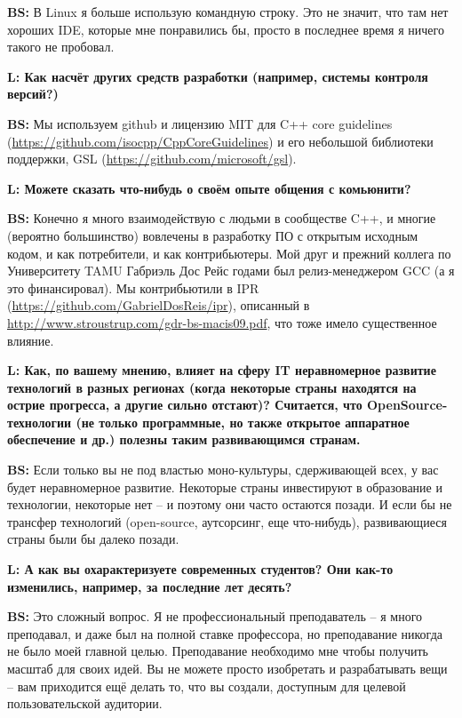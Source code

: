 \documentclass[10pt, a5paper]{article}
\begin{document}
\begin{Parallel}[p]{}{}
{{\noindent \bf BS:} В Linux я больше использую командную строку. Это не значит, что там нет хороших IDE, которые мне понравились бы, просто в последнее время я ничего такого не пробовал.

{\noindent \bf L: Как насчёт других средств разработки (например, системы контроля версий?)}

{\noindent \bf BS:} Мы используем github и лицензию MIT для C++ core guidelines (\href{https://github.com/isocpp/CppCoreGuidelines}{https://github.com/isocpp/CppCoreGuidelines}) и его небольшой библиотеки поддержки, GSL (\url{https://github.com/microsoft/gsl}).

{\noindent \bf L: Можете сказать что-нибудь о своём опыте общения с комьюнити?}

{\noindent \bf BS:} Конечно я много взаимодействую с людьми в сообществе C++, и многие (вероятно большинство) вовлечены в разработку ПО с открытым исходным кодом, и как потребители, и как контрибьютеры. Мой друг и прежний коллега по Университету TAMU Габриэль Дос Рейс годами был релиз-менеджером GCC (а я это финансировал). Мы контрибьютили в IPR (\url{https://github.com/GabrielDosReis/ipr}), описанный в \url{http://www.stroustrup.com/gdr-bs-macis09.pdf}, что тоже имело существенное влияние.

{\noindent \bf L:  Как, по вашему мнению, влияет на сферу IT неравномерное развитие технологий в разных регионах (когда некоторые страны находятся на острие прогресса, а другие сильно отстают)? Считается, что OpenSource-технологии (не только программные, но также открытое аппаратное обеспечение и др.) полезны таким развивающимся странам.}

{\noindent \bf BS:} Если только вы не под властью моно-культуры, сдерживающей всех, у вас будет неравномерное развитие. Некоторые страны инвестируют в образование и технологии, некоторые нет -- и поэтому они часто остаются позади. И если бы не трансфер технологий (open-source, аутсорсинг, еще что-нибудь), развивающиеся страны были бы далеко позади.

{\noindent \bf L: А как вы охарактеризуете современных студентов? Они как-то изменились, например, за последние лет десять?}

{\noindent \bf BS:} Это сложный вопрос. Я не профессиональный преподаватель – я много преподавал, и даже был на полной ставке профессора, но преподавание никогда не было моей главной целью. Преподавание необходимо мне чтобы получить масштаб для своих идей. Вы не можете просто изобретать и разрабатывать вещи – вам приходится ещё делать то, что вы создали, доступным для целевой пользовательской аудитории.

}
\end{Parallel}
\end{document}
